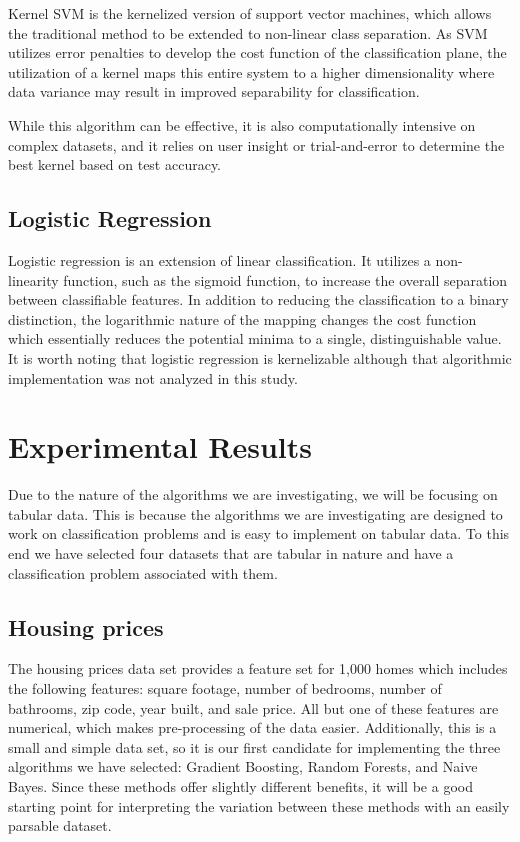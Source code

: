 \documentclass[10pt,twocolumn,letterpaper]{article}
\begin{document}
Kernel SVM is the kernelized version of support vector machines, which allows the traditional method to be extended to non-linear class separation.
As SVM utilizes error penalties to develop the cost function of the classification plane, the utilization of a kernel maps this entire system to a higher dimensionality where data variance may result in improved separability for classification.

While this algorithm can be effective, it is also computationally intensive on complex datasets, and it relies on user insight or trial-and-error to determine the best kernel based on test accuracy. 


\subsection{Logistic Regression}

Logistic regression is an extension of linear classification. It utilizes a non-linearity function, such as the sigmoid function, to increase the overall separation between classifiable features.
In addition to reducing the classification to a binary distinction, the logarithmic nature of the mapping changes the cost function which essentially reduces the potential minima to a single, distinguishable value.
It is worth noting that logistic regression is kernelizable although that algorithmic implementation was not analyzed in this study.


\section{Experimental Results}

Due to the nature of the algorithms we are investigating, we will be focusing on tabular data.
This is because the algorithms we are investigating are designed to work on classification problems and is easy to implement on tabular data.
To this end we have selected four datasets that are tabular in nature and have a classification problem associated with them.

\subsection{Housing prices \cite{ds1}}

The housing prices data set provides a feature set for 1,000 homes which includes the following features: square footage, number of bedrooms, number of bathrooms, zip code, year built, and sale price.
All but one of these features are numerical, which makes pre-processing of the data easier.
Additionally, this is a small and simple data set, so it is our first candidate for implementing the three algorithms we have selected: Gradient Boosting, Random Forests, and Naive Bayes.
Since these methods offer slightly different benefits, it will be a good starting point for interpreting the variation between these methods with an easily parsable dataset.
\end{document}
